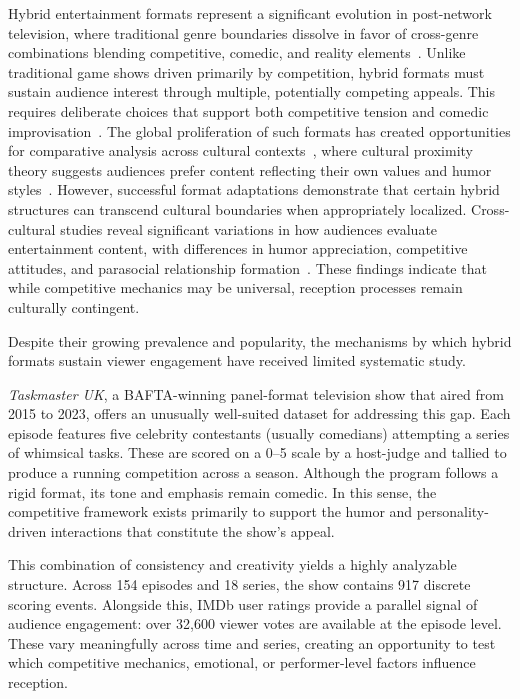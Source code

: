 \documentclass[10pt,letterpaper]{article}
\begin{document}
Hybrid entertainment formats represent a significant evolution in post-network television, where traditional genre boundaries dissolve in favor of cross-genre combinations blending competitive, comedic, and reality elements~\cite{Vassallo2016,Gil2012}. Unlike traditional game shows driven primarily by competition, hybrid formats must sustain audience interest through multiple, potentially competing appeals. This requires deliberate choices that support both competitive tension and comedic improvisation~\cite{OBITEL2018}. The global proliferation of such formats has created opportunities for comparative analysis across cultural contexts~\cite{Larkey2016}, where cultural proximity theory suggests audiences prefer content reflecting their own values and humor styles~\cite{Straubhaar2007,Trepte2008}. However, successful format adaptations demonstrate that certain hybrid structures can transcend cultural boundaries when appropriately localized. Cross-cultural studies reveal significant variations in how audiences evaluate entertainment content, with differences in humor appreciation, competitive attitudes, and parasocial relationship formation~\cite{YooEtAl2014,GarciaBéjar2021}. These findings indicate that while competitive mechanics may be universal, reception processes remain culturally contingent.

Despite their growing prevalence and popularity, the mechanisms by which hybrid formats sustain viewer engagement have received limited systematic study.

\textit{Taskmaster UK}, a BAFTA-winning panel-format television show that aired from 2015 to 2023, offers an unusually well-suited dataset for addressing this gap. Each episode features five celebrity contestants (usually comedians) attempting a series of whimsical tasks. These are scored on a 0–5 scale by a host-judge and tallied to produce a running competition across a season. Although the program follows a rigid format, its tone and emphasis remain comedic. In this sense, the competitive framework exists primarily to support the humor and personality-driven interactions that constitute the show’s appeal.

This combination of consistency and creativity yields a highly analyzable structure. Across 154 episodes and 18 series, the show contains 917 discrete scoring events. Alongside this, IMDb user ratings provide a parallel signal of audience engagement: over 32,600 viewer votes are available at the episode level. These vary meaningfully across time and series, creating an opportunity to test which competitive mechanics, emotional, or performer-level factors influence reception.
\end{document}
